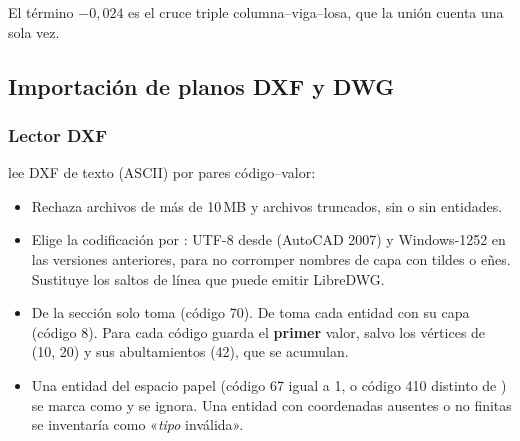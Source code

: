 El término $-0{,}024$ es el cruce triple columna--viga--losa, que la unión cuenta una sola vez.

\subsection{Importación de planos DXF y DWG}
\label{sec:mod-dxf}

\subsubsection{Lector DXF}

 lee DXF de texto (ASCII) por pares
código--valor:

\begin{itemize}
	\item Rechaza archivos de más de 10\,MB y archivos truncados, sin  o sin entidades.
	\item Elige la codificación por : UTF-8 desde  (AutoCAD 2007) y Windows-1252 en las
	      versiones anteriores, para no corromper nombres de capa con tildes o eñes. Sustituye los saltos de línea
	       que puede emitir LibreDWG.
	\item De la sección  solo toma  (código 70). De  toma cada entidad con su
	      capa (código 8). Para cada código guarda el \textbf{primer} valor, salvo los vértices de
	       (10, 20) y sus abultamientos (42), que se acumulan.
	\item Una entidad del espacio papel (código 67 igual a 1, o código 410 distinto de ) se marca como
	       y se ignora. Una entidad con coordenadas ausentes o no finitas se inventaría como
	      «\textit{tipo} inválida».
\end{itemize}

